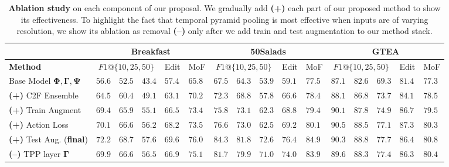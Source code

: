 \documentclass[10pt,twocolumn,letterpaper]{article}
\newcommand{\enc}{\ensuremath{\mathbf{\Phi}}}
\newcommand{\dec}{\ensuremath{\mathbf{\Psi}}}
\newcommand{\bottle}{\ensuremath{\mathbf{\Gamma}}}
\begin{document}
\begin{table*}[t]
\begin{center}
\small{
\begin{tabular}{p{2.7cm} | p{0.5cm}p{0.5cm}p{0.5cm}p{0.5cm}p{0.6cm} | p{0.5cm}p{0.5cm}p{0.5cm}p{0.5cm}p{0.6cm} | p{0.5cm}p{0.5cm}p{0.5cm}p{0.5cm}p{0.6cm}}
\hline
& \multicolumn{5}{c|}{Breakfast} & \multicolumn{5}{c|}{50Salads} & \multicolumn{5}{c}{GTEA} \\
\hline\hline
\textbf{Method} & \multicolumn{3}{c}{$F1@\{10,25,50\}$} & Edit & MoF & \multicolumn{3}{c}{$F1@\{10,25,50\}$} & Edit & MoF & \multicolumn{3}{c}{$F1@\{10,25,50\}$} & Edit & MoF\\
\hline
Base Model $\enc,\bottle,\dec$ & $56.6$ & $52.5$ & $43.4$ & $57.4$ & $65.8$ & 
                $67.5$ & $64.3$ & $53.9$ & $59.1$ & $77.5$ & 
                $87.1$ & $82.6$ & $69.3$ & $81.4$ & $77.3$\\ 
 \textbf{(+)} C2F Ensemble & $64.5$ & $60.4$ & $49.1$ & $63.1$ & $70.2$
                            &$72.3$ & $68.8$ & $57.8$ & $66.6$&$78.4$
                            &$88.1$ & $86.8$ &$73.7$ &$84.1$& $78.5$ \\
 \textbf{(+)} Train Augment & $69.4$ & $65.9$ & $55.1$ & $66.5$ & $73.4$ & 
                 $75.8$ & $73.1$ & $62.3$ & $68.8$ & $79.4$ & 
                 $90.1$ & $87.8$ & $74.9$ & $86.7$ & $79.5$ \\
 \textbf{(+)} Action Loss & $70.1$ & $66.6$ & $56.2$ & $68.2$ & $73.5$ & 
                $76.6$ & $73.0$ & $62.5$ & $69.2$ & $80.1$ & 
                $\mathbf{90.5}$ & $88.5$ & $77.1$ & $\mathbf{87.3}$ & $80.3$ \\
 \textbf{(+)} Test Aug. (\textbf{final}) & $\mathbf{72.2}$ & $\mathbf{68.7}$ & $\mathbf{57.6}$ & $\mathbf{69.6}$ & $\mathbf{76.0}$ 
                & $\mathbf{84.3}$ & $\mathbf{81.8}$ & $\mathbf{72.6}$ & $\mathbf{76.4}$ & $\mathbf{84.9}$ & 
                $90.3$ & $\mathbf{88.8}$ & $\mathbf{77.7}$ & $86.4$ & $\mathbf{80.8}$ \\
 \textbf{(--)} TPP layer $\bottle$ & $69.9$ & $66.6$ & $56.5$ & $66.9$ & $75.1$ &
                $81.7$ & $79.9$ & $71.0$ & $74.0$ & $83.9$ & 
                $89.6$ & $88.3$ & $77.4$ & $86.3$ & $80.4$ \\
\hline\hline
\end{tabular}
}
\end{center}
\caption{\textbf{Ablation study} on each component of our proposal. We gradually add \textbf{(+)} each part of our proposed method to show its effectiveness. To highlight the fact that temporal pyramid pooling is most effective when inputs are of varying resolution, we show its ablation as removal \textbf{(--)} only after we add train and test augmentation to our method stack.}\label{tab:ablation}
\end{table*}
\end{document}

